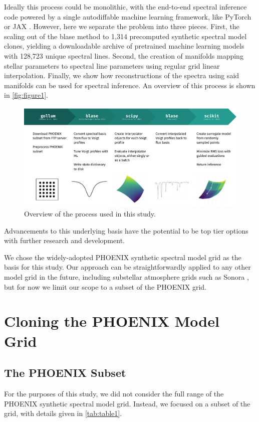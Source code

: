 \documentclass[twocolumn]{aastex631}
\begin{document}
Ideally this process could be monolithic, with the end-to-end spectral inference code powered by a single autodiffable machine learning framework, like PyTorch or JAX \citep{pytorch, jax}. 
However, here we separate the problem into three pieces. 
First, the scaling out of the blase method to 1,314 precomputed synthetic spectral model clones, yielding a downloadable archive of pretrained machine learning models with 128,723 unique spectral lines. 
Second, the creation of manifolds mapping stellar parameters to spectral line parameters using regular grid linear interpolation. 
Finally, we show how reconstructions of the spectra using said manifolds can be used for spectral inference.
An overview of this process is shown in \autoref{fig:figure1}.
\begin{figure}
    \centering
    \includegraphics[width=\textwidth]{figure1}
    \caption{Overview of the process used in this study.}
    \label{fig:figure1}
\end{figure}
Advancements to this underlying basis have the potential to be top tier options with further research and development.

We chose the widely-adopted PHOENIX synthetic spectral model grid \citep{PHOENIX} as the basis for this study.
Our approach can be straightforwardly applied to any other model grid in the future, including substellar atmosphere grids such as Sonora \citep{bobcat, cholla, diamondback, elfowl}, but for now we limit our scope to a subset of the PHOENIX grid.

\section{Cloning the PHOENIX Model Grid}
\subsection{The PHOENIX Subset}
For the purposes of this study, we did not consider the full range of the PHOENIX synthetic spectral model grid. 
Instead, we focused on a subset of the grid, with details given in \autoref{tab:table1}.
\end{document}
